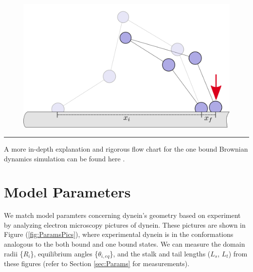 \begin{figure}[H]
\centering
\includegraphics[width=0.7\columnwidth]{Figures/montecarlo6.png}
\label{fig:mc4}
\end{figure}

\noindent\rule{16.5cm}{0.4pt}

A more in-depth explanation and rigorous flow chart for the one bound Brownian dynamics simulation can be found here \cite{Capek2017, }.



\section{Model Parameters}

We match model paramters concerning dynein's geometry based on experiment by analyzing electron microscopy pictures of dynein. These pictures are shown in Figure (\ref{fig:ParamsPics}), where experimental dynein is in the conformations analogous to the both bound and one bound states. We can measure the domain radii \{$R_i$\}, equilibrium angles \{$\theta_{i,eq}$\}, and the stalk and tail lengths ($L_s$, $L_t$) from these figures (refer to Section \ref{sec:Params} for measurements).  


